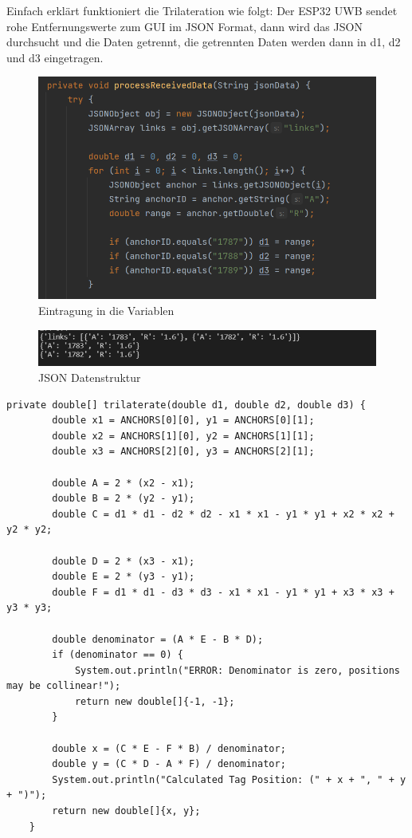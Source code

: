 Einfach erklärt funktioniert die Trilateration wie folgt: Der ESP32 UWB sendet rohe Entfernungswerte zum GUI im JSON Format, dann wird das JSON durchsucht und die Daten getrennt, die getrennten Daten werden dann in d1, d2 und d3 eingetragen.

\begin{figure}[H]
	\centering
	\includegraphics[width=0.5\linewidth]{images/EintragungVariablen.png}
	\caption[EintragungVariablen]{Eintragung in die Variablen}
	\label{fig:Variableneintragung}
\end{figure}

\begin{figure}[H]
	\centering
	\includegraphics[width=0.5\linewidth]{images/JSONData.png}
	\caption[JSONData]{JSON Datenstruktur}
	\label{fig:JSONData}
\end{figure}

\begin{lstlisting}[style=Java, caption=Trilateration in Java, captionpos=b]
	private double[] trilaterate(double d1, double d2, double d3) {
		double x1 = ANCHORS[0][0], y1 = ANCHORS[0][1];
		double x2 = ANCHORS[1][0], y2 = ANCHORS[1][1];
		double x3 = ANCHORS[2][0], y3 = ANCHORS[2][1];
		
		double A = 2 * (x2 - x1);
		double B = 2 * (y2 - y1);
		double C = d1 * d1 - d2 * d2 - x1 * x1 - y1 * y1 + x2 * x2 + y2 * y2;
		
		double D = 2 * (x3 - x1);
		double E = 2 * (y3 - y1);
		double F = d1 * d1 - d3 * d3 - x1 * x1 - y1 * y1 + x3 * x3 + y3 * y3;
		
		double denominator = (A * E - B * D);
		if (denominator == 0) {
			System.out.println("ERROR: Denominator is zero, positions may be collinear!");
			return new double[]{-1, -1};
		}
		
		double x = (C * E - F * B) / denominator;
		double y = (C * D - A * F) / denominator;
		System.out.println("Calculated Tag Position: (" + x + ", " + y + ")");
		return new double[]{x, y};
	}
\end{lstlisting}
